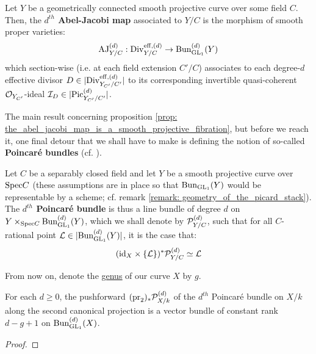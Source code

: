         \begin{definition} \label{def: the_abel_jacobi_map}
            Let $Y$ be a geometrically connected smooth projective curve over some field $C$. Then, the \textbf{$d^{th}$ Abel-Jacobi map} associated to $Y/C$ is the morphism of smooth proper varieties:
                $$\mathrm{AJ}_{Y/C}^{(d)}: \mathrm{Div}_{Y/C}^{\mathrm{eff}, (d)} \to \mathrm{Bun}_{\operatorname{GL}_1}^{(d)}(Y)$$
            which section-wise (i.e. at each field extension $C'/C$) associates to each degree-$d$ effective divisor $D \in |\mathrm{Div}_{Y_{C'}/C'}^{\mathrm{eff}, (d)}|$ to its corresponding invertible quasi-coherent $\mathcal{O}_{Y_{C'}}$-ideal $\mathcal{I}_D \in |\mathrm{Pic}_{Y_{C'}/C'}^{(d)}|$.
        \end{definition}
        The main result concerning proposition \ref{prop: the_abel_jacobi_map_is_a_smooth_projective_fibration}, but before we reach it, one final detour that we shall have to make is defining the notion of so-called \textbf{Poincar\'e bundles} (cf. \cite[Exercise 4.3]{kleiman2005picard}).
        \begin{definition} \label{def: poincare_bundles}
            Let $C$ be a separably closed field and let $Y$ be a smooth projective curve over $\mathrm{Spec} C$ (these assumptions are in place so that $\mathrm{Bun}_{\operatorname{GL}_1}(Y)$ would be representable by a scheme; cf. remark \ref{remark: geometry_of_the_picard_stack}). The \textbf{$d^{th}$ Poincar\'e bundle} is thus a line bundle of degree $d$ on $Y \x_{\Spec C} \Bun_{\GL_1}^{(d)}(Y)$, which we shall denote by $\mathcal{P}_{Y/C}^{(d)}$, such that for all $C$-rational point $\mathcal{L} \in |\mathrm{Bun}_{\operatorname{GL}_1}^{(d)}(Y)|$, it is the case that:
                $$(\id_X \x \{\calL\})^* \calP_{Y/C}^{(d)} \cong \calL$$
        \end{definition}
        \begin{convention} \label{conv: genus_of_the_curve}
            From now on, denote the \href{https://stacks.math.columbia.edu/tag/0BY6}{\underline{genus}} of our curve $X$ by $g$.
        \end{convention}
        \begin{lemma} \label{lemma: projective_bundle_defined_by_poincare_bundle}
            For each $d \geq 0$, the pushforward $(\operatorname{pr}_2)_*\mathcal{P}_{X/k}^{(d)}$ of the $d^{th}$ Poincar\'e bundle on $X/k$ along the second canonical projection is a vector bundle of constant rank $d - g + 1$ on $\mathrm{Bun}_{\operatorname{GL}_1}^{(d)}(X)$. 
        \end{lemma}
            \begin{proof}
                
            \end{proof}
